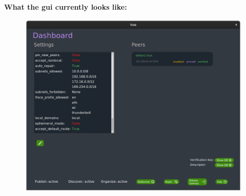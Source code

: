 \documentclass[
    type=projectproposal,
    twocolumn
]{bfhpub}
\begin{document}
\par\nointerlineskip\bfhRule
 
\newpage

\textbf{What the gui currently looks like:}
\begin{figure}[ht]
    \centering
    \begin{minipage}{0.49\linewidth}
        \centering
        \includegraphics[width=\linewidth]{./../misc/frontend/dashboard.png}
    \end{minipage}\hfill
    \begin{minipage}{0.49\linewidth}
        \centering

\end{minipage}
\end{figure}
\end{document}
